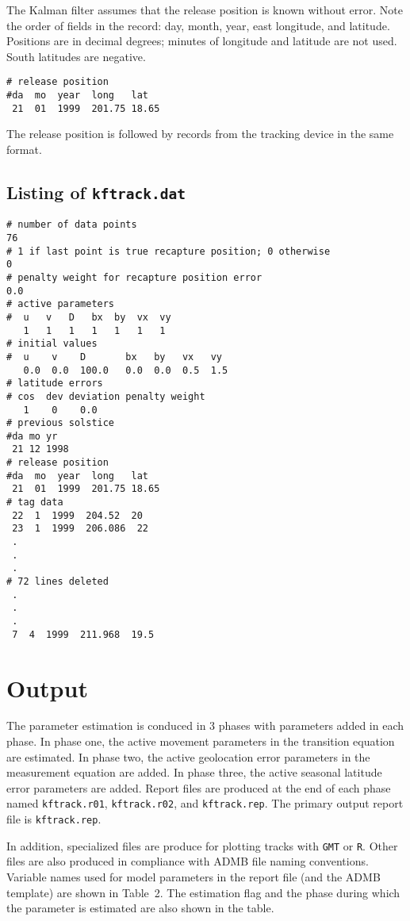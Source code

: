 \documentclass[12pt,draft,titlepage,twoside]{article}
\begin{document}
The Kalman filter assumes that the release position is known without error. 
Note the order of fields in the record: day, month, year, east longitude, and latitude. Positions are in decimal degrees; 
minutes of longitude and latitude are not used. 
South latitudes are negative.
\begin{verbatim}
# release position
#da  mo  year  long   lat
 21  01  1999  201.75 18.65
\end{verbatim}
The release position is followed by records from the tracking device in the same
format.


\subsection{Listing of \texttt{kftrack.dat}}
\begin{verbatim}
# number of data points
76
# 1 if last point is true recapture position; 0 otherwise
0 
# penalty weight for recapture position error
0.0
# active parameters
#  u   v   D   bx  by  vx  vy
   1   1   1   1   1   1   1
# initial values
#  u    v    D       bx   by   vx   vy
   0.0  0.0  100.0   0.0  0.0  0.5  1.5
# latitude errors  
# cos  dev deviation penalty weight
   1    0    0.0
# previous solstice
#da mo yr
 21 12 1998
# release position
#da  mo  year  long   lat
 21  01  1999  201.75 18.65
# tag data
 22  1  1999  204.52  20
 23  1  1999  206.086  22
 .
 .
 .
# 72 lines deleted
 .
 .
 . 
 7  4  1999  211.968  19.5
\end{verbatim}


\section{Output}

The parameter estimation is conduced in 3 phases with parameters added 
in each phase. 
In phase one, the active movement parameters in the transition equation are estimated. 
In phase two, the active geolocation error parameters in the measurement equation are added.
In phase three, the active seasonal latitude error parameters are added.
Report files are produced at the end of each phase
named \texttt{kftrack.r01}, \texttt{kftrack.r02}, and \texttt{kftrack.rep}.
The primary output report file is \texttt{kftrack.rep}.

In addition, specialized files are produce for plotting tracks with \texttt{GMT}
or \texttt{R}.
Other files are also produced in compliance with ADMB file naming conventions.
Variable names used for model parameters in the report file 
(and the ADMB template) are shown in Table~2. %
The estimation flag and the phase during which the parameter is estimated
are also shown in the table.
\end{document}
